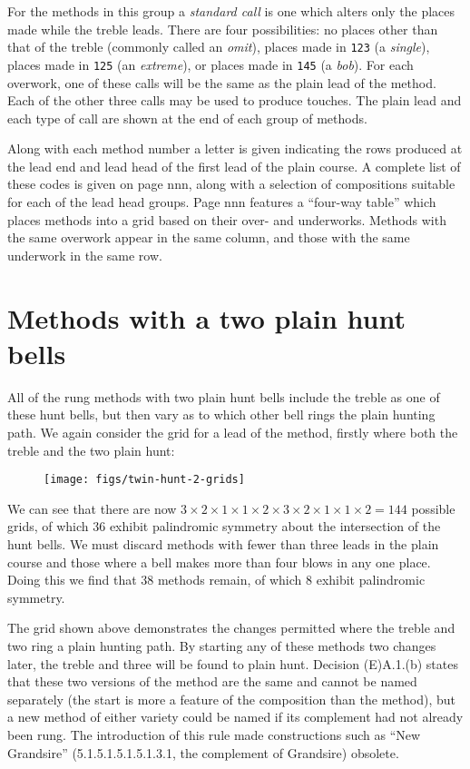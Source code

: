 For the methods in this group a \emph{standard call} is one which alters only
the places made while the treble leads.
There are four possibilities:
no places other than that of the treble (commonly called an \emph{omit}),
places made in {\tt 123} (a \emph{single}),
places made in {\tt 125} (an \emph{extreme}),
or places made in {\tt 145} (a \emph{bob}).
For each overwork,
one of these calls will be the same as the plain lead of the method.
Each of the other three calls may be used to produce touches.
The plain lead and each type of call are shown at the end of each group of
methods.

Along with each method number a letter is given indicating the rows produced at
the lead end and lead head of the first lead of the plain course.
A complete list of these codes is given on page nnn,
along with a selection of compositions suitable for each of the lead head
groups.
Page nnn features a “four-way table” which places methods into a grid based on
their over- and underworks.
Methods with the same overwork appear in the same column,
and those with the same underwork in the same row.

\section{Methods with a two plain hunt bells} \label{sec:intro-double-hunt}

All of the rung methods with two plain hunt bells include the treble as one of
these hunt bells,
but then vary as to which other bell rings the plain hunting path.
We again consider the grid for a lead of the method,
firstly where both the treble and the two plain hunt:

\begin{figure}[h]
  \centering
  \texttt{[image: figs/twin-hunt-2-grids]}
\end{figure}

We can see that there are now
\(3\times2\times1\times1\times2\times3\times2\times1\times1\times 2 = 144\)
possible grids, of which 36 exhibit palindromic symmetry about the intersection
of the hunt bells.
We must discard methods with fewer than three leads in the plain course and
those where a bell makes more than four blows in any one place.
Doing this we find that 38 methods remain,
of which 8 exhibit palindromic symmetry.

The grid shown above demonstrates the changes permitted where the treble and two
ring a plain hunting path.
By starting any of these methods two changes later,
the treble and three will be found to plain hunt.
Decision (E)A.1.(b) states that these two versions of the method are the same
and cannot be named separately
(the start is more a feature of the composition than the method),
but a new method of either variety could be named if its complement had not
already been rung.
The introduction of this rule made constructions such as ``New Grandsire''
(5.1.5.1.5.1.5.1.3.1, the complement of Grandsire) obsolete.

